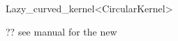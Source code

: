 \begin{ccRefClass}{Lazy_curved_kernel<CircularKernel>}

\ccDefinition


\ccIsModel


\ccParameters

?? see manual for the new 

\end{ccRefClass}
